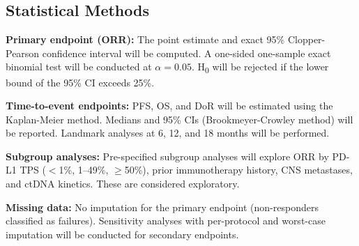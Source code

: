 \subsection{Statistical Methods}

\textbf{Primary endpoint (ORR):} The point estimate and exact 95\% Clopper-Pearson confidence interval will be computed. A one-sided one-sample exact binomial test will be conducted at $\alpha=0.05$. H\textsubscript{0} will be rejected if the lower bound of the 95\% CI exceeds 25\%.

\textbf{Time-to-event endpoints:} PFS, OS, and DoR will be estimated using the Kaplan-Meier method. Medians and 95\% CIs (Brookmeyer-Crowley method) will be reported. Landmark analyses at 6, 12, and 18 months will be performed.

\textbf{Subgroup analyses:} Pre-specified subgroup analyses will explore ORR by PD-L1 TPS ($<$1\%, 1--49\%, $\geq$50\%), prior immunotherapy history, CNS metastases, and ctDNA kinetics. These are considered exploratory.

\textbf{Missing data:} No imputation for the primary endpoint (non-responders classified as failures). Sensitivity analyses with per-protocol and worst-case imputation will be conducted for secondary endpoints.

